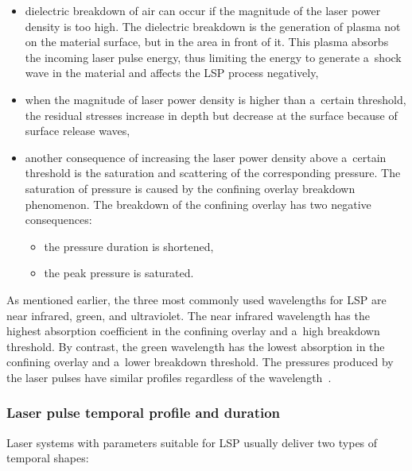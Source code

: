 \begin{itemize}

    \item dielectric breakdown of air can occur if the magnitude of the laser power density is too high. The dielectric breakdown is the generation of plasma not on the material surface, but in the area in front of it. This plasma absorbs the incoming laser pulse energy, thus limiting the energy to generate a~shock wave in the material and affects the LSP process negatively,

    \item when the magnitude of laser power density is higher than a~certain threshold, the residual stresses increase in depth but decrease at the surface because of surface release waves,

    \item another consequence of increasing the laser power density above a~certain threshold is the saturation and scattering of the corresponding pressure. The saturation of pressure is caused by the confining overlay breakdown phenomenon. The breakdown of the confining overlay has two negative consequences: 
    
    \begin{itemize}
        \item the pressure duration is shortened,
        \item the peak pressure is saturated.
    \end{itemize}
  
  
\end{itemize}    

As mentioned earlier, the three most commonly used wavelengths for LSP are near infrared, green, and ultraviolet. The near infrared wavelength has the highest absorption coefficient in the confining overlay and a~high breakdown threshold. By contrast, the green wavelength has the lowest absorption in the confining overlay and a~lower breakdown threshold. The pressures produced by the laser pulses have similar profiles regardless of the wavelength~\cite{berthe_fabbro_peyre_bartnicki_1999}.



\subsubsection*{Laser pulse temporal profile and duration}

Laser systems with parameters suitable for LSP usually deliver two types of temporal shapes:

